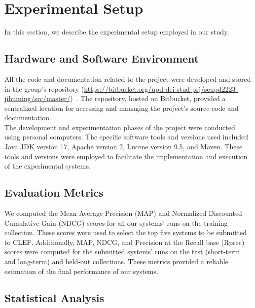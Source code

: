 \section{Experimental Setup}
\label{sec:setup}

In this section, we describe the experimental setup employed in our study.

\subsection{Hardware and Software Environment}\label{subsec:hardware-and-software-environment}

All the code and documentation related to the project were developed and stored in the group's repository
(\href{https://bitbucket.org/upd-dei-stud-prj/seupd2223-jihuming/src/master/}{https://bitbucket.org/upd-dei-stud-prj/seupd2223-jihuming/src/master/})~\cite{jihuming}.
The repository, hosted on Bitbucket, provided a centralized location for accessing and managing the project's source
code and documentation.\\

The development and experimentation phases of the project were conducted using personal computers.
The specific software tools and versions used included Java JDK version 17, Apache version 2, Lucene version 9.5, and
Maven.
These tools and versions were employed to facilitate the implementation and execution of the experimental systems.

\subsection{Evaluation Metrics}\label{subsec:evaluation-metrics}

We computed the Mean Average Precision (MAP) and Normalized Discounted Cumulative Gain (NDCG) scores for all our
systems' runs on the training collection.
These scores were used to select the top five systems to be submitted to CLEF.
Additionally, MAP, NDCG, and Precision at the Recall base (Rprec) scores were computed for the submitted systems' runs
on the test (short-term and long-term) and held-out collections.
These metrics provided a reliable estimation of the final performance of our systems.

\subsection{Statistical Analysis}\label{subsec:statistical-analysis}

